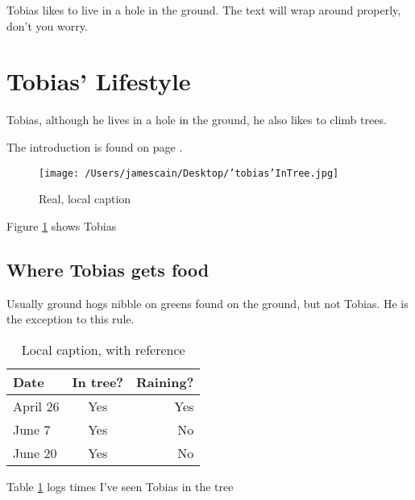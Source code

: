 \documentclass{article}
\begin{document}
Tobias likes to live in a hole in the ground. The text will wrap around properly, don't you worry.

\lipsum[1]


\newpage
\section{Tobias' Lifestyle}
Tobias, although he lives in a hole in the ground, he also likes to climb trees. \cite{Cain2020}

The introduction is found on page \pageref{sec:intro}.

\begin{figure}[H]
    \centering
    \texttt{[image: /Users/jamescain/Desktop/'tobias'InTree.jpg]}
    \caption[Optional caption]{Real, local caption}
    \label{fig:tobias}
\end{figure}

Figure \ref{fig:tobias} shows Tobias

\subsection{Where Tobias gets food}
Usually ground hogs nibble on greens found on the ground, but not Tobias. He is the exception to this rule.

\begin{table}[H]
    \centering
    \caption[This is optional caption, without reference]{Local caption, with reference \cite{Cain2020}}
    \label{tab:tobiastreesightings}
    \begin{tabular}{ l c r}
        \bfseries{Date} & In tree? & Raining? \\ \hline
        April 26 & Yes & Yes \\
        June 7 & Yes & No \\
        June 20 & Yes & No \\
    \end{tabular}
\end{table}

Table \ref{tab:tobiastreesightings} logs times I've seen Tobias in the tree
\end{document}
